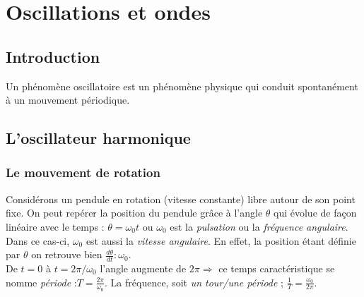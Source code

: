 \documentclass	[11pt, a4paper, openany]{book}
\begin{document}
	
	
	
	
	
	
	
	
	
	
	
	
	
	
	
	
	
	
	
	
	
	
	
	
	
	
	
	
	
	
	
	
	
	
	
	
	
	\chapter{Oscillations et ondes}
	\section{Introduction}
	Un phénomène oscillatoire est un phénomène physique qui conduit spontanément à un mouvement périodique.
	
	\section{L'oscillateur harmonique} 
	\subsection{Le mouvement de rotation}
	Considérons un pendule en rotation (vitesse constante) libre autour de son point fixe. 
	On peut repérer la position du pendule grâce à l'angle $\theta$ qui évolue de façon linéaire avec le temps : $\theta = \omega_0 t$ ou $\omega_0$ est la \textit{pulsation} ou la \textit{fréquence angulaire}.\\
	Dans ce cas-ci, $\omega_0$ est aussi la \textit{vitesse angulaire}. En effet, la position étant définie par $\theta$ on retrouve bien $\frac{d\theta}{dt} : \omega_0$.\\
	
	De $t = 0$ à $t = 2\pi/\omega_0$ l'angle augmente de $2\pi \Rightarrow$ ce temps caractéristique se nomme \textit{période} :$T = \frac{2\pi}{\omega_0}$. La fréquence, soit \textit{un tour/une période} ; $\frac{1}{T} = \frac{\omega_0}{2\pi}$.\\
	
\end{document}
